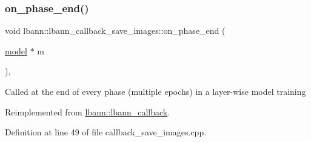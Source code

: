 \subsubsection{\texorpdfstring{on\+\_\+phase\+\_\+end()}{on\_phase\_end()}}
{\footnotesize\ttfamily void lbann\+::lbann\+\_\+callback\+\_\+save\+\_\+images\+::on\+\_\+phase\+\_\+end (\begin{DoxyParamCaption}\item[{\hyperlink{classlbann_1_1model}{model} $\ast$}]{m }\end{DoxyParamCaption})\hspace{0.3cm}{\ttfamily [override]}, {\ttfamily [virtual]}}

Called at the end of every phase (multiple epochs) in a layer-\/wise model training 

Reimplemented from \hyperlink{classlbann_1_1lbann__callback_ace7452239c9ad7aa6247e9496adbcffe}{lbann\+::lbann\+\_\+callback}.



Definition at line 49 of file callback\+\_\+save\+\_\+images.\+cpp.


